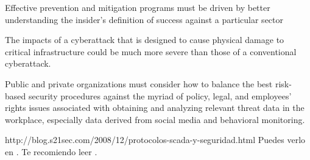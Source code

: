 \documentclass[jou]{apa6}   %
\begin{document}
Effective prevention and mitigation programs must be driven by better understanding
the insider’s definition of success against a particular sector

The impacts of a cyberattack that is designed to cause physical damage to critical
infrastructure could be much more severe than those of a conventional cyberattack.

Public and private organizations must consider how to balance the best risk-based
security procedures against the myriad of policy, legal, and employees’ rights issues
associated with obtaining and analyzing relevant threat data in the workplace,
especially data derived from social media and behavioral monitoring.

http://blog.s21sec.com/2008/12/protocolos-scada-y-seguridad.html
Puedes verlo en \cite{Patricio2011}. Te recomiendo leer \cite{Patricio2011, Zacarias2009, Alfonso2010b, Alfonso2010a}.



\end{document}
